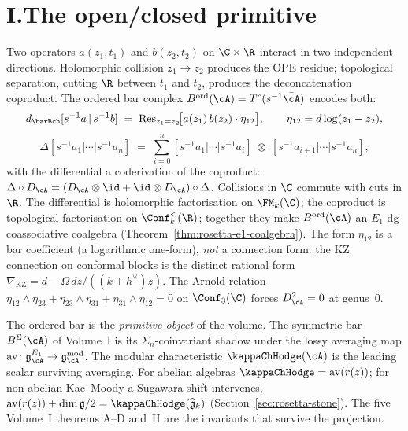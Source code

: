 \section*{I.\quad The open/closed primitive}

\noindent
Two operators $a(z_1, t_1)$ and $b(z_2, t_2)$ on $\C \times \R$
interact in two independent directions. Holomorphic collision
$z_1 \to z_2$ produces the OPE residue; topological separation,
cutting $\R$ between $t_1$ and $t_2$, produces the deconcatenation
coproduct. The ordered bar complex
$B^{\mathrm{ord}}(\cA) = T^c(s^{-1}\bar\cA)$ encodes both:
\[
d_{\barBch}[s^{-1}a \,|\, s^{-1}b]
\;=\;
\Res_{z_1 = z_2}\!\bigl[
 a(z_1)\,b(z_2)\cdot\eta_{12}
\bigr],
\qquad
\eta_{12} = d\log(z_1 - z_2),
\]
\begin{equation}\label{eq:preface-delta}
\Delta[s^{-1}a_1|\cdots|s^{-1}a_n]
\;=\;
\sum_{i=0}^{n}
[s^{-1}a_1|\cdots|s^{-1}a_i]
\;\otimes\;
[s^{-1}a_{i+1}|\cdots|s^{-1}a_n],
\end{equation}
with the differential a coderivation of the coproduct:
$\Delta \circ D_\cA = (D_\cA \otimes \id + \id \otimes D_\cA)
\circ \Delta$. Collisions in $\C$ commute with cuts in $\R$.
The differential is holomorphic factorisation on
$\FM_k(\C)$; the coproduct is topological factorisation on
$\Conf_k^{<}(\R)$; together they make $B^{\mathrm{ord}}(\cA)$ an
$E_1$ dg coassociative coalgebra
(Theorem~\ref{thm:rosetta-e1-coalgebra}). The form
$\eta_{12}$ is a bar coefficient (a logarithmic one-form),
\emph{not} a connection form: the KZ connection on conformal
blocks is the distinct rational form
$\nabla_{\mathrm{KZ}} = d - \Omega\,dz/((k+h^\vee)z)$. The
Arnold relation
$\eta_{12}\wedge\eta_{23} + \eta_{23}\wedge\eta_{31}
+ \eta_{31}\wedge\eta_{12} = 0$ on $\Conf_3(\C)$ forces
$D_\cA^2 = 0$ at genus~$0$.

The ordered bar is the \emph{primitive object} of the volume.
The symmetric bar $B^{\Sigma}(\cA)$ of Volume~I is its
$\Sigma_n$-coinvariant shadow under the lossy averaging map
$\operatorname{av}\colon \mathfrak{g}^{E_1}_\cA
\to \mathfrak{g}^{\mathrm{mod}}_\cA$. The modular characteristic
$\kappaChHodge(\cA)$ is the leading scalar surviving
averaging. For abelian algebras
$\kappaChHodge = \mathrm{av}(r(z))$; for non-abelian
Kac--Moody a Sugawara shift intervenes,
$\mathrm{av}(r(z)) + \dim\fg/2 = \kappaChHodge(\widehat{\fg}_k)$
(Section~\ref{sec:rosetta-stone}). The five Volume~I
theorems A--D and~H are the invariants that survive the
projection.

